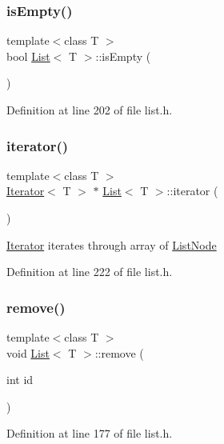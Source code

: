 \subsubsection{\texorpdfstring{is\+Empty()}{isEmpty()}}
{\footnotesize\ttfamily template$<$class T $>$ \\
bool \hyperlink{classList}{List}$<$ T $>$\+::is\+Empty (\begin{DoxyParamCaption}{ }\end{DoxyParamCaption})}



Definition at line 202 of file list.\+h.

\mbox{\label{classList_aa4bebd7fe394b1738da32e33fd095774}} 
\subsubsection{\texorpdfstring{iterator()}{iterator()}}
{\footnotesize\ttfamily template$<$class T $>$ \\
\hyperlink{classIterator}{Iterator}$<$ T $>$ $\ast$ \hyperlink{classList}{List}$<$ T $>$\+::iterator (\begin{DoxyParamCaption}{ }\end{DoxyParamCaption})}

\hyperlink{classIterator}{Iterator} iterates through array of \hyperlink{classListNode}{List\+Node} 

Definition at line 222 of file list.\+h.

\mbox{\label{classList_a55b17d95199c1e323f13d9bd45e2d3cc}} 
\subsubsection{\texorpdfstring{remove()}{remove()}}
{\footnotesize\ttfamily template$<$class T $>$ \\
void \hyperlink{classList}{List}$<$ T $>$\+::remove (\begin{DoxyParamCaption}\item[{int}]{id }\end{DoxyParamCaption})}



Definition at line 177 of file list.\+h.

\mbox{\label{classList_a2497bdf42246d61237aaf046c116183a}} 
